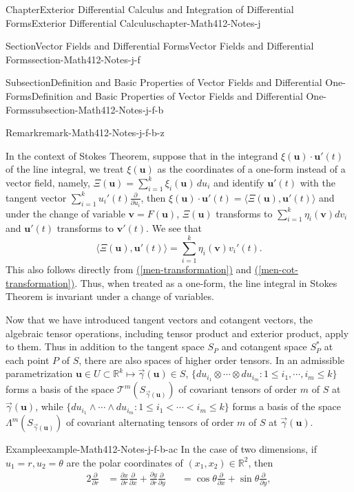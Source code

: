 \documentclass[oneside,10pt,]{book}
\newcommand{\xreffont}{\relax}
\numberwithin{equation}{section}
\newcommand{\bu}{\mathbf{u}}
\newcommand{\bv}{\mathbf{v}}
\newcommand{\bbR}{\mathbb{R}}
\newcommand{\vg}{{\vec{\gamma}}}
\newcommand{\lt}{<}
\newcommand{\amp}{&}
\begin{document}
\begin{chapterptx}{Chapter}{Exterior Differential Calculus and Integration of Differential Forms}{}{Exterior Differential Calculus}{}{}{chapter-Math412-Notes-j}
\begin{sectionptx}{Section}{Vector Fields and Differential Forms}{}{Vector Fields and Differential Forms}{}{}{section-Math412-Notes-j-f}
\begin{subsectionptx}{Subsection}{Definition and Basic Properties of Vector Fields and Differential One-Forms}{}{Definition and Basic Properties of Vector Fields and Differential One-Forms}{}{}{subsection-Math412-Notes-j-f-b}
\begin{remark}{Remark}{}{remark-Math412-Notes-j-f-b-z}
%
\end{remark}
In the context of Stokes Theorem, suppose that in the integrand \(\xi(\bu)\cdot \bu'(t)\) of the line integral, we treat \(\xi(\bu)\) as the coordinates of a one-form instead of a vector field, namely, \(\Xi(\bu)=\sum_{i=1}^{k}\xi_{i}(\bu)\,du_{i}\) and identify \(\bu'(t)\) with the tangent vector \(\sum_{i=1}^{k}u_{i}'(t)\frac{\partial }{\partial u_{i}}\), then \(\xi(\bu)\cdot \bu'(t)=\langle \Xi(\bu), \bu'(t)\rangle\) and under the change of variable \(\bv=F(\bu)\),  \(\Xi(\bu)\) transforms to \(\sum_{i=1}^{k}\eta_{i}(\bv) dv_{i}\) and \(\bu'(t)\) transforms to \(\bv'(t)\). We see that%
\begin{equation*}
\langle \Xi(\bu), \bu'(t)\rangle=\sum_{i=1}^{k}\eta_{i}(\bv) v_{i}'(t).
\end{equation*}
This also follows directly from \hyperref[men-transformation]{({\xreffont\ref{men-transformation}})}  and \hyperref[men-cot-transformation]{({\xreffont\ref{men-cot-transformation}})}. Thus, when treated as a one-form, the line integral in Stokes Theorem is invariant under a change of variables.%
\par
Now that we have introduced tangent vectors and cotangent vectors, the algebraic tensor operations, including tensor product and exterior product, apply to them. Thus in addition to the tangent space \(S_{P}\) and cotangent space \(S_{P}^{*}\) at each point \(P\) of \(S\), there are also spaces of higher order  tensors. In an admissible parametrization \(\bu\in U\subset \bbR^{k}\mapsto \vg(\bu)\in S\), \(\{ du_{i_{1}}\otimes \cdots \otimes du_{i_{m}}: 1\le i_{1},\cdots, i_{m}\le k\}\) forms a basis of the space \({\mathcal T}^{m}(S_{\vg(\bu)})\) of covariant tensors of order \(m\) of \(S\) at \(\vg(\bu)\), while \(\{ du_{i_{1}}\wedge \cdots \wedge du_{i_{m}}: 1\le i_{1}\lt \cdots \lt i_{m}\le k\}\) forms a basis of the space \({\Lambda}^{m}(S_{\vg(\bu)})\) of covariant alternating tensors of order \(m\) of \(S\) at \(\vg(\bu)\).%
\begin{example}{Example}{}{example-Math412-Notes-j-f-b-ac}%
In the case of two dimensions, if \(u_{1}=r, u_{2}=\theta\) are the polar coordinates of \((x_{1}, x_{2})\in {\mathbb R}^{2}\), then%
\begin{alignat*}{2}
\frac{\partial }{\partial r} \amp= \frac{\partial x}{\partial r} \frac{\partial }{\partial x} +
\frac{\partial y}{\partial r} \frac{\partial }{\partial y} \amp\amp
= \cos \theta \frac{\partial }{\partial x} + \sin \theta \frac{\partial }{\partial y},\\

\end{alignat*}
\end{example}
\end{subsectionptx}
\end{sectionptx}
\end{chapterptx}
\end{document}
